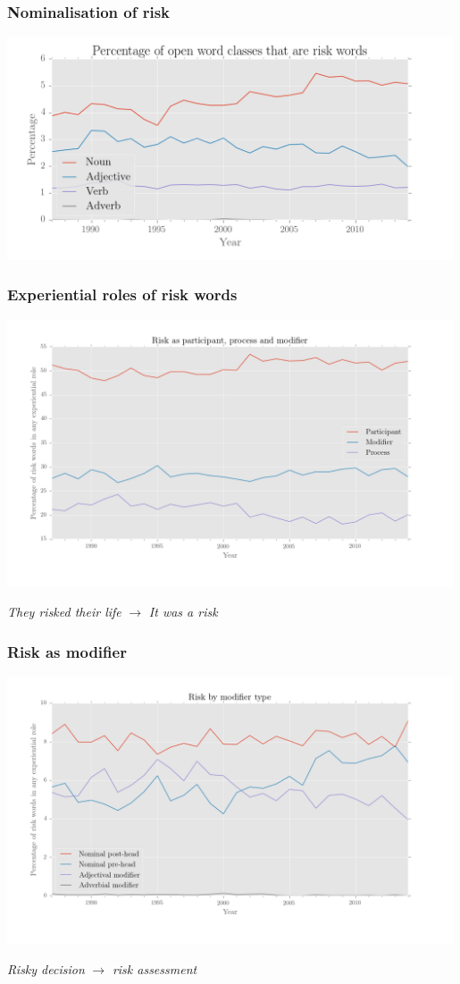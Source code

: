 \documentclass{beamer}       %
\begin{document}
\begin{frame}
    \frametitle{Nominalisation of risk}
    \centering
    \includegraphics[width=0.99\textwidth]{../../images/percentage-of-open-word-classes-that-are-risk-words}
\end{frame}

\begin{frame}
    \frametitle{Experiential roles of risk words}
    \centering
    \includegraphics[width=0.99\textwidth]{../../images/ppm_final_colour}

    \noindent \emph{They risked their life} $\rightarrow$ \emph{It was a risk}
\end{frame}

\begin{frame}
    \frametitle{Risk as modifier}
    \centering
    \includegraphics[width=0.99\textwidth]{../../images/risk_by_mod_type_colour}

    \noindent \emph{Risky decision} $\rightarrow$ \emph{risk assessment}
\end{frame}
\end{document}
